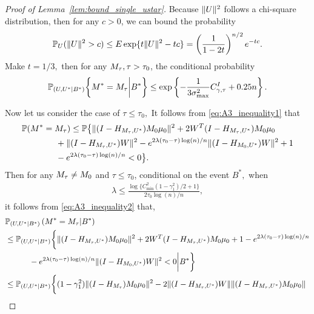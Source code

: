 \documentclass[10pt,a4paper]{amsart}
\def\P{\mathbb P}
\begin{document}
\begin{proof}[Proof of Lemma~\ref{lem:bound_single_ustar}]
 
 
Because $\|\*U\|^2$ follows a  chi-square distribution, then for any $c>0$, we can bound the probability
\begin{align}
\label{eq:markov_ineuqality}
      \P_{\*U}(\|\*U\|^2 > c)  \leq E \exp\{t\|\*U\|^2 -tc\} 
    = \left(\frac{1}{1-2t}\right)^{n/2}e^{-tc}.
\end{align}
Make $t = 1/3,$ then for any $\*M_\tau, \tau > \tau_0$, the conditional probability
\begin{align}
\label{eq:bound_tau_large}
      \P_{(\*U, \*U^*|B^*)}\bigg\{{\*M}^* = \*M_\tau \bigg | B^* \bigg\} \leq \exp\left\{-\frac{1}{3\sigma^2_{\max}} C^I_{\gamma, \tau} + 0.25n \right\}.
\end{align}


Now let us consider the case of $\tau \leq \tau_0,$  
 It follows from \eqref{eq:A3_inequality1} that
\begin{align}
\label{eq:A3_inequality2}
    &   \P({\*M}^*  = \*M_\tau)
    \leq  \P\big\{ \|(\*I-\*H_{\*M_{\tau}, \*U^*})\*M_0 \*\mu_0\|^2 +  2 \*W^T (\*I-\*H_{\*M_{\tau}, \*U^*})\*M_0 \*\mu_0  \nonumber \\
    & \qquad\qquad + \|(\*I-\*H_{\*M_{\tau}, \*U^*})\*W\|^2 - e^{2\lambda(\tau_0-\tau)\log(n)/n} \|(\*I-\*H_{\*M_0, \*U^*})\*W\|^2 +1 \\
    & \qquad\qquad -e^{2\lambda(\tau_0-\tau)\log(n)/n} < 0\big\}. \nonumber
\end{align}
Then for any $\*M_\tau \neq \*M_0$ and $ \tau \leq \tau_0$,  
conditional on the event $B^*,$ when 
\begin{align}
\label{eq:lambda_upper}
    \lambda \leq \frac{\log\{C^2_{\min}(1- \gamma^2_1)/2 + 1\}}{2 \tau_0 \log(n)/n},
\end{align}
it follows from  
\eqref{eq:A3_inequality2} that,     
\begin{align*}
    &   \P_{(\*U, \*U^*|B^*)}\left({\*M}^*  = \*M_\tau \middle| B^*\right) \\
    & \leq \P_{(\*U, \*U^*|B^*)}\bigg\{\|(\*I-\*H_{\*M_\tau, \*U^*})\*M_0 \*\mu_0\|^2  + 2 \*W^T (\*I-\*H_{\*M_\tau, \*U^*})\*M_0 \*\mu_0 +1 -e^{2\lambda(\tau_0-\tau)\log(n)/n}  \\
    &   \quad  \quad \quad   - e^{2\lambda(\tau_0-\tau)\log(n)/n} \|(\*I-\*H_{\*M_0, \*U^*})\*W\|^2  < 0   \bigg |  B^*\bigg\}\\
     & \leq \P_{(\*U, \*U^*|B^*)}\bigg\{(1 - \gamma^2_1)\|(\*I-\*H_{\*M_\tau})\*M_0 \*\mu_0\|^2  - 2 \|(\*I-\*H_{\*M_\tau, \*U^*})\*W\| \|(\*I-\*H_{\*M_\tau, \*U^*})\*M_0 \*\mu_0\|  \\ 

\end{align*}
\end{proof}
\end{document}

